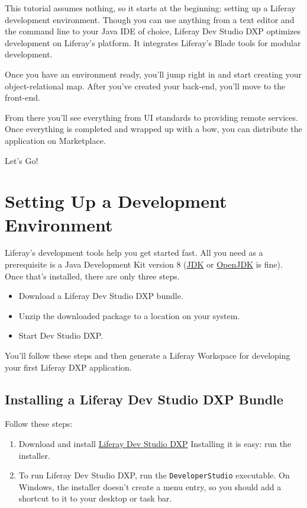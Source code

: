 This tutorial assumes nothing, so it starts at the beginning: setting up
a Liferay development environment. Though you can use anything from a
text editor and the command line to your Java IDE of choice, Liferay Dev
Studio DXP optimizes development on Liferay's platform. It integrates
Liferay's Blade tools for modular development.

Once you have an environment ready, you'll jump right in and start
creating your object-relational map. After you've created your back-end,
you'll move to the front-end.

From there you'll see everything from UI standards to providing remote
services. Once everything is completed and wrapped up with a bow, you
can distribute the application on Marketplace.

Let's Go!{}

\chapter{Setting Up a Development
Environment}\label{setting-up-a-development-environment}

Liferay's development tools help you get started fast. All you need as a
prerequisite is a Java Development Kit version 8
(\href{http://www.oracle.com/technetwork/java/javase/downloads/jdk8-downloads-2133151.html}{JDK}
or \href{https://jdk.java.net/java-se-ri/8}{OpenJDK} is fine). Once
that's installed, there are only three steps.

\begin{itemize}
\item
  Download a Liferay Dev Studio DXP bundle.
\item
  Unzip the downloaded package to a location on your system.
\item
  Start Dev Studio DXP.
\end{itemize}

You'll follow these steps and then generate a Liferay Workspace for
developing your first Liferay DXP application.

\section{Installing a Liferay Dev Studio DXP
Bundle}\label{installing-a-liferay-dev-studio-dxp-bundle}

Follow these steps:

\begin{enumerate}
\def\labelenumi{\arabic{enumi}.}
\item
  Download and install
  \href{/docs/7-2/reference/-/knowledge_base/r/installing-liferay-dev-studio}{Liferay
  Dev Studio DXP} Installing it is easy: run the installer.
\item
  To run Liferay Dev Studio DXP, run the \texttt{DeveloperStudio}
  executable. On Windows, the installer doesn't create a menu entry, so
  you should add a shortcut to it to your desktop or task bar.
\end{enumerate}

